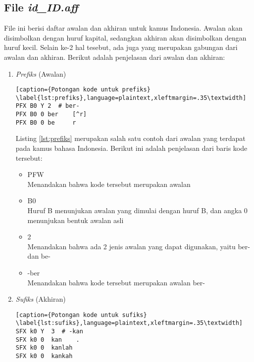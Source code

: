 \subsection{File \textit{id\_ID.aff}}

File ini berisi daftar awalan dan akhiran untuk kamus Indonesia. Awalan akan disimbolkan dengan huruf kapital, sedangkan akhiran akan disimbolkan dengan huruf kecil. Selain ke-2 hal tesebut, ada juga yang merupakan gabungan dari awalan dan akhiran. Berikut adalah penjelasan dari awalan dan akhiran:

\begin{enumerate}
	\item \textit{Prefiks} (Awalan) \\
	
	\begin{lstlisting}[caption={Potongan kode untuk prefiks}			\label{lst:prefiks},language=plaintext,xleftmargin=.35\textwidth] 
PFX B0 Y 2	# ber-
PFX B0 0 ber  	[^r]
PFX B0 0 be    	r
	\end{lstlisting}
	
	Listing \ref{lst:prefiks} merupakan salah satu contoh dari awalan yang terdapat pada kamus bahasa Indonesia. Berikut ini adalah penjelasan dari baris kode tersebut:	

	\begin{itemize}
		\item PFW\\
		Menandakan bahwa kode tersebut merupakan awalan
		
		\item B0\\
		Huruf B menunjukan awalan yang dimulai dengan huruf B, dan angka 0 menunjukan bentuk awalan asli
		
		\item 2\\
		Menandakan bahwa ada 2 jenis awalan yang dapat digunakan, yaitu ber- dan be-
		\item -ber\\
		Menandakan bahwa kode tersebut merupakan awalan ber-
	\end{itemize}	
		
	\item \textit{Sufiks} (Akhiran) \\	
	
	\begin{lstlisting}[caption={Potongan kode untuk sufiks}			\label{lst:sufiks},language=plaintext,xleftmargin=.35\textwidth] 
SFX k0 Y  3	 # -kan
SFX k0 0  kan    . 
SFX k0 0  kanlah
SFX k0 0  kankah
	\end{lstlisting}
	

\end{enumerate}
